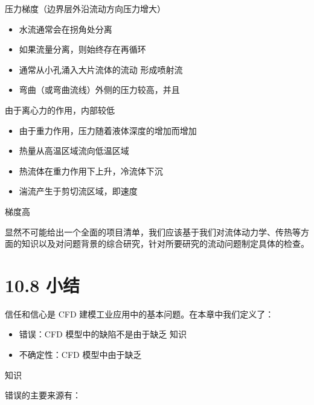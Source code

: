 \documentclass[11pt,a4paper,openany,fontset=none]{ctexbook}
\begin{document}
压力梯度（边界层外沿流动方向压力增大）

\begin{itemize}

\item 水流通常会在拐角处分离

\item 如果流量分离，则始终存在再循环

\item 通常从小孔涌入大片流体的流动 形成喷射流

\item 弯曲（或弯曲流线）外侧的压力较高，并且

\end{itemize}

由于离心力的作用，内部较低

\begin{itemize}

\item 由于重力作用，压力随着液体深度的增加而增加

\item 热量从高温区域流向低温区域

\item 热流体在重力作用下上升，冷流体下沉

\item 湍流产生于剪切流区域，即速度

\end{itemize}

梯度高

显然不可能给出一个全面的项目清单，我们应该基于我们对流体动力学、传热等方面的知识以及对问题背景的综合研究，针对所要研究的流动问题制定具体的检查。

\section*{10.8 小结}

信任和信心是 CFD 建模工业应用中的基本问题。在本章中我们定义了：

\begin{itemize}

\item 错误：CFD 模型中的缺陷不是由于缺乏 知识

\item 不确定性：CFD 模型中由于缺乏

\end{itemize}

知识

错误的主要来源有：
\end{document}
